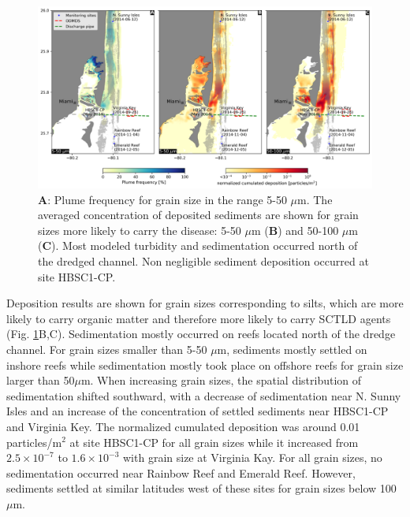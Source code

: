 \begin{figure}
	\centering
	\includegraphics[width=\textwidth]{chapters/onset/figures/deposition_plumes.png}
	\caption{\textbf{A}: Plume frequency for grain size in the range 5-50 $\mu$m. The averaged concentration of deposited sediments are shown for grain sizes more likely to carry the disease: 5-50 $\mu$m (\textbf{B}) and 50-100 $\mu$m (\textbf{C}). Most modeled turbidity and sedimentation occurred north of the dredged channel. Non negligible sediment deposition occurred at site HBSC1-CP.}
	\label{fig:onset_depo}    
\end{figure}

Deposition results are shown for grain sizes corresponding to silts, which are more likely to carry organic matter and therefore more likely to carry SCTLD agents \citep{erftemeijer2012environmental}(Fig. \ref{fig:onset_depo}B,C). Sedimentation mostly occurred on reefs located north of the dredge channel. For grain sizes smaller than 5-50 $\mu$m, sediments mostly settled on inshore reefs while sedimentation mostly took place on offshore reefs for grain size larger than 50$\mu$m. When increasing grain sizes, the spatial distribution of sedimentation shifted southward, with a decrease of sedimentation near N. Sunny Isles and an increase of the concentration of settled sediments near HBSC1-CP and Virginia Key. The normalized cumulated deposition was around 0.01 particles/m$^2$ at site HBSC1-CP for all grain sizes while it increased from $2.5\times 10^{-7}$ to $1.6\times 10^{-3}$ with grain size at Virginia Kay. For all grain sizes, no sedimentation occurred near Rainbow Reef and Emerald Reef. However, sediments settled at similar latitudes west of these sites for grain sizes below 100 $\mu$m.

